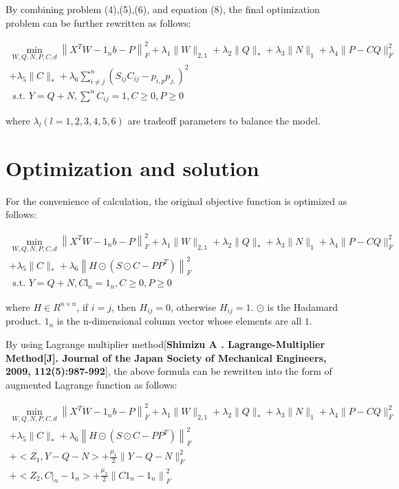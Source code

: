 \documentclass[final,3p,times]{elsarticle}
\begin{document}
By combining problem (4),(5),(6), and equation (8), the final optimization problem can be further rewritten as follows:

\begin{equation}
\begin{array}{l}
	\min _{W, Q, N, P, C, d}\left\|X^{T} W-1_{n} b-P\right\|_{F}^{2}+\lambda_{1}\|W\|_{2,1}+\lambda_{2}\|Q\|_{*}+\lambda_{3}\|N\|_{1}+\lambda_{4}\|P-C Q\|_{F}^{2} \\
	+\lambda_{5}\|C\|_{*}+\lambda_{6}\sum_{i \neq j}^{n}\left(S_{i j} C_{i j}-p_{i, p} p_{j,}\right)^{2} \\
	\text { s.t. } Y=Q+N, \sum^{n} C_{i j}=1, C \geq 0, P \geq 0
\end{array}
\end{equation}

\noindent where $\lambda_{l} (l=1,2,3,4,5,6)$ are tradeoff parameters to balance the model. 

\section{Optimization and solution}

For the convenience of calculation, the original objective function is optimized as follows:

\begin{equation}
	\begin{array}{l}
		\min _{W, Q, N, P, C, d}\left\|X^{T} W-1_{n} b-P\right\|_{F}^{2}+\lambda_{1}\|W\|_{2,1}+\lambda_{2}\|Q\|_{*}+\lambda_{3}\|N\|_{1}+\lambda_{4}\|P-C Q\|_{F}^{2} \\
		+\lambda_{5}\|C\|_{*}+\lambda_{6}\left\|H \odot\left(S \odot C-P P^{T}\right)\right\|_{F}^{2}\\
		\text { s.t. } Y=Q+N, C \mathrm{l}_{n}=1_{n}, C \geq 0, P \geq 0
	\end{array}
\end{equation}

\noindent where $H \in R^{n \times n}$, if $i=j$, then $H_{ij}=0$, otherwise $H_{ij}=1$. $\odot$ is the Hadamard product. $1_{n}$ is the n-dimensional column vector whose elements are all $1$.

By using Lagrange multiplier method[\textbf{Shimizu A . Lagrange-Multiplier Method[J]. Journal of the Japan Society of Mechanical Engineers, 2009, 112(5):987-992}], the above formula can be rewritten into the form of augmented Lagrange function as follows:

\begin{equation}
	\begin{array}{l}
		\min _{W, Q, N, P, C, d}\left\|X^{T} W-1_{n} b-P\right\|_{F}^{2}+\lambda_{1}\|W\|_{2,1}+\lambda_{2}\|Q\|_{*}+\lambda_{3}\|N\|_{1}+\lambda_{4}\|P-C Q\|_{F}^{2} \\
		+\lambda_{5}\|C\|_{*}+\lambda_{6}\left\|H \odot\left(S \odot C-P P^{T}\right)\right\|_{F}^{2}\\
		+<Z_{1}, Y-Q-N>+\frac{\mu_1}{2}\|Y-Q-N\|_{F}^{2} \\
		+<Z_{2},\left.C\right|_{n}-1_{n}>+\frac{\mu_{2}}{2}\left\|C 1_{n}-1_{n}\right\|_{F}^{2}
	\end{array}
\end{equation}
\end{document}

